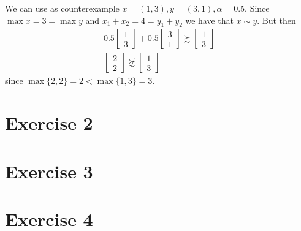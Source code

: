 \documentclass[12pt]{extarticle}
\numberwithin{table}{section}
\numberwithin{figure}{section}
\numberwithin{equation}{section}
\begin{document}
\begin{enumerate}[label=\alph*.)]
          We can use as counterexample $x = (1, 3), y = (3, 1), \alpha = 0.5$.
          Since $\max x = 3 = \max y$ and $x_1 + x_2 = 4 = y_1 + y_2$ we have that $x \sim y$.
          But then
          \begin{gather}
              0.5 \begin{bmatrix}1 \\ 3\end{bmatrix} + 0.5 \begin{bmatrix}3 \\ 1\end{bmatrix} \succsim \begin{bmatrix}1 \\ 3\end{bmatrix} \\
              \begin{bmatrix}2 \\ 2\end{bmatrix} \not \succsim \begin{bmatrix}1 \\ 3\end{bmatrix}
          \end{gather}
          since $\max\{2,2\} = 2 < \max\{ 1, 3 \} = 3$.
\end{enumerate}

\section{Exercise 2}

\section{Exercise 3}

\section{Exercise 4}
\end{document}

